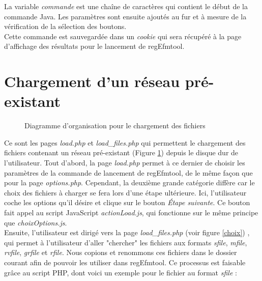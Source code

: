 La variable \textit{commande} est une chaîne de caractères qui contient le début de la commande Java. Les paramètres sont ensuite ajoutés au fur et à mesure de la vérification de la sélection des boutons. \\

Cette commande est sauvegardée dans un \textit{cookie} qui sera récupéré à la page d'affichage des résultats pour le lancement de regEfmtool. 

\section{Chargement d'un réseau pré-existant}

\begin{figure}[!ht]
	\begin{center}
		\caption{Diagramme d'organisation pour le chargement des fichiers}
  		\label{DiagLoad}
  	\end{center}	
\end{figure}

Ce sont les pages \emph{load.php} et \emph{load\_files.php} qui permettent le chargement des fichiers contenant un réseau pré-existant (Figure \ref{DiagLoad}) depuis le disque dur de l'utilisateur. Tout d'abord, la page \emph{load.php} permet à ce dernier de choisir les paramètres de la commande de lancement de regEfmtool, de le même façon que pour la page \emph{options.php}. Cependant, la deuxième grande catégorie diffère car le choix des fichiers à charger se fera lors d'une étape ultérieure. Ici, l'utilisateur coche les options qu'il désire et clique sur le bouton \textit{Étape suivante}. Ce bouton fait appel au script JavaScript \emph{actionLoad.js}, qui fonctionne sur le même principe que \emph{choixOptions.js}. \\

Ensuite, l'utilisateur est dirigé vers la page \emph{load\_files.php} (voir figure \ref{choix}) , qui permet à l'utilisateur d'aller "chercher" les fichiers aux formats \textit{sfile}, \textit{mfile}, \textit{rvfile}, \textit{grfile} et \textit{rfile}. Nous copions et renommons ces fichiers dans le dossier courant afin de pouvoir les utiliser dans regEfmtool. Ce processus est faisable grâce au script PHP, dont voici un exemple pour le fichier au format \textit{sfile} :\\

